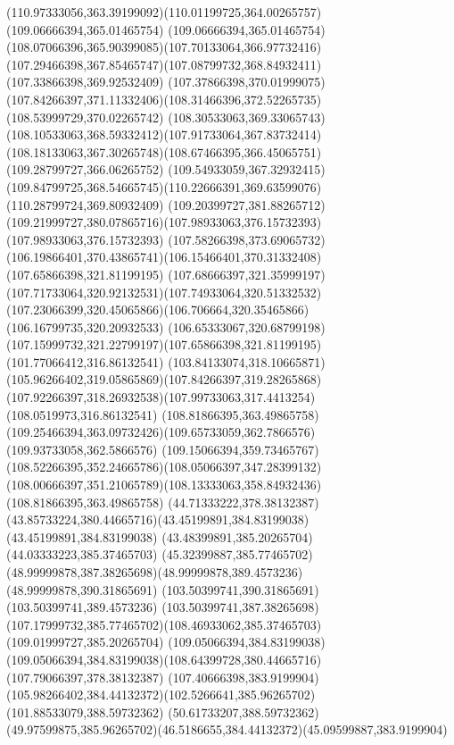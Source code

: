 {{\curveto(110.97333056,363.39199092)(110.01199725,364.00265757)(109.06666394,365.01465754)
\curveto(109.06666394,365.01465754)(108.07066396,365.90399085)(107.70133064,366.97732416)
\curveto(107.29466398,367.85465747)(107.08799732,368.84932411)(107.33866398,369.92532409)
\curveto(107.37866398,370.01999075)(107.84266397,371.11332406)(108.31466396,372.52265735)
\lineto(108.53999729,370.02265742)
\curveto(108.30533063,369.33065743)(108.10533063,368.59332412)(107.91733064,367.83732414)
\curveto(108.18133063,367.30265748)(108.67466395,366.45065751)(109.28799727,366.06265752)
\curveto(109.54933059,367.32932415)(109.84799725,368.54665745)(110.22666391,369.63599076)
\lineto(110.28799724,369.80932409)
\lineto(109.20399727,381.88265712)
\curveto(109.21999727,380.07865716)(107.98933063,376.15732393)(107.98933063,376.15732393)
\curveto(107.58266398,373.69065732)(106.19866401,370.43865741)(106.15466401,370.31332408)
\moveto(107.65866398,321.81199195)
\curveto(107.68666397,321.35999197)(107.71733064,320.92132531)(107.74933064,320.51332532)
\curveto(107.23066399,320.45065866)(106.706664,320.35465866)(106.16799735,320.20932533)
\curveto(106.65333067,320.68799198)(107.15999732,321.22799197)(107.65866398,321.81199195)
\moveto(101.77066412,316.86132541)
\curveto(103.84133074,318.10665871)(105.96266402,319.05865869)(107.84266397,319.28265868)
\curveto(107.92266397,318.26932538)(107.99733063,317.4413254)(108.0519973,316.86132541)
\closepath
\moveto(108.81866395,363.49865758)
\curveto(109.25466394,363.09732426)(109.65733059,362.7866576)(109.93733058,362.5866576)
\curveto(109.15066394,359.73465767)(108.52266395,352.24665786)(108.05066397,347.28399132)
\curveto(108.00666397,351.21065789)(108.13333063,358.84932436)(108.81866395,363.49865758)
\moveto(44.71333222,378.38132387)
\curveto(43.85733224,380.44665716)(43.45199891,384.83199038)(43.45199891,384.83199038)
\lineto(43.48399891,385.20265704)
\lineto(44.03333223,385.37465703)
\curveto(45.32399887,385.77465702)(48.99999878,387.38265698)(48.99999878,389.4573236)
\lineto(48.99999878,390.31865691)
\lineto(103.50399741,390.31865691)
\lineto(103.50399741,389.4573236)
\curveto(103.50399741,387.38265698)(107.17999732,385.77465702)(108.46933062,385.37465703)
\lineto(109.01999727,385.20265704)
\lineto(109.05066394,384.83199038)
\curveto(109.05066394,384.83199038)(108.64399728,380.44665716)(107.79066397,378.38132387)
\lineto(107.40666398,383.9199904)
\curveto(105.98266402,384.44132372)(102.5266641,385.96265702)(101.88533079,388.59732362)
\lineto(50.61733207,388.59732362)
\curveto(49.97599875,385.96265702)(46.5186655,384.44132372)(45.09599887,383.9199904)
}}
